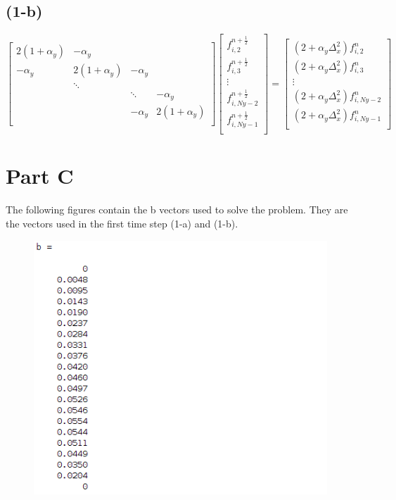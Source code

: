 \documentclass[12pt]{article}
\begin{document}
	\subsection{(1-b)}
		\[
		\begin{bmatrix} 
		2(1+\alpha_y) & -\alpha_y   &			   &\\
		-\alpha_y & 2(1+\alpha_y) & -\alpha_y  &\\
		& \ddots &			   &\\
		&	 	  & \ddots & -\alpha_y  \\
		&		  & -\alpha_y & 2(1+\alpha_y)  \\ 
		\end{bmatrix}
		\begin{bmatrix} 
		f_{i,2}^{n+\frac{1}{2}}\\
		f_{i,3}^{n+\frac{1}{2}}\\
		\vdots\\
		f_{i,Ny-2}^{n+\frac{1}{2}}\\
		f_{i,Ny-1}^{n+\frac{1}{2}}\\ 
		\end{bmatrix} = 
		\begin{bmatrix} 
		(2 + \alpha_y\Delta_x^2)f_{i,2}^{n}\\
		(2 + \alpha_y\Delta_x^2)f_{i,3}^{n}\\
		\vdots\\
		(2 + \alpha_y\Delta_x^2)f_{i,Ny-2}^{n}\\
		(2 + \alpha_y\Delta_x^2)f_{i,Ny-1}^{n}\\ 
		\end{bmatrix}
		\]
	\newpage
	\section{Part C}
		
	\noindent The following figures contain the b vectors used to solve the problem. They are the vectors used in the first time step (1-a) and (1-b).
	
	\begin{figure}[H]
		\centering
		\includegraphics[height=3.75in]{b_mat_1.png}
		\label{fig:bmat1}
	\end{figure}
		
\end{document}

